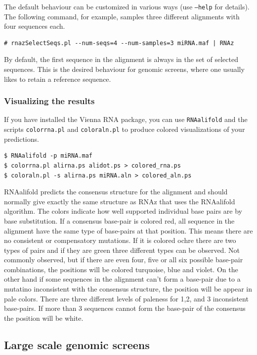 \documentclass[11pt]{article}
\begin{document}
The default behaviour can be customized in various ways (use
\texttt{--help} for details). The following command, for example, samples
three different alignments with four sequences each.

\begin{verbatim}
# rnazSelectSeqs.pl --num-seqs=4 --num-samples=3 miRNA.maf | RNAz
\end{verbatim}

By default, the first sequence in the alignment is always in the set
of selected sequences. This is the desired behaviour for genomic
screens, where one usually likes to retain a reference sequence.


\subsubsection{Visualizing the results}

If you have installed the Vienna RNA package, you can use
\texttt{RNAalifold} and the scripts \texttt{colorrna.pl} and
\texttt{coloraln.pl} to produce colored visualizations of your
predictions.


\begin{verbatim}
$ RNAalifold -p miRNA.maf
$ colorrna.pl alirna.ps alidot.ps > colored_rna.ps
$ coloraln.pl -s alirna.ps miRNA.aln > colored_aln.ps
\end{verbatim}

RNAalifold predicts the consensus structure for the alignment and
should normally give exactly the same structure as RNAz that uses the
RNAalifold algorithm. The colors indicate how well supported
individual base pairs are by base substitution. If a consensus
base-pair is colored red, all sequence in the alignment have the same
type of base-pairs at that position. This means there are no
consistent or compensatory mutations. If it is colored ochre there are
two types of pairs and if they are green three different types can be
observed. Not commonly observed, but if there are even four, five or
all six possible base-pair combinations, the positions will be colored
turquoise, blue and violet. On the other hand if some sequences in the
alignment can't form a base-pair due to a mutatino inconsistent with
the consensus structure, the position will be appear in pale
colors. There are three different levels of paleness for 1,2, and 3
inconsistent base-pairs. If more than 3 sequences cannot form the
base-pair of the consensus the position will be white.


\subsection{Large scale genomic screens}
\label{sec:large-scale-genomic}
\end{document}
